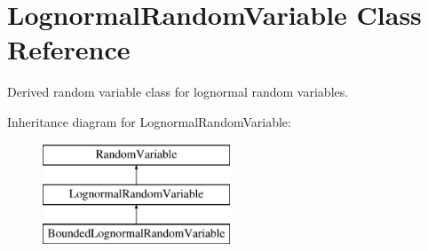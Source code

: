 \section{Lognormal\+Random\+Variable Class Reference}
\label{classPecos_1_1LognormalRandomVariable}


Derived random variable class for lognormal random variables.  


Inheritance diagram for Lognormal\+Random\+Variable\+:\begin{figure}[H]
\begin{center}
\leavevmode
\includegraphics[height=3.000000cm]{classPecos_1_1LognormalRandomVariable}
\end{center}
\end{figure}
